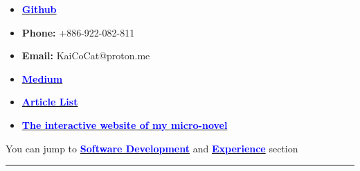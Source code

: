 
\begin{definitionbox}
{\footnotesize
\begin{itemize}[noitemsep]
    \item \href{https://github.com/Kuo-TingKai}{\textbf{\textcolor{blue}{Github}}}
    \item \textbf{Phone:} +886-922-082-811
    \item \textbf{Email:} KaiCoCat@proton.me
    \item \href{https://medium.com/@nehsm30126}{\textbf{\textcolor{blue}{Medium}}} 
    \item \href{https://www.overleaf.com/read/xzdtxtgxtnby#49163b}{\textbf{\textcolor{blue}{Article List}}}
    \item \href{https://github.com/Kuo-TingKai/theorem-dream}{\textbf{\textcolor{blue}{The interactive website of my micro-novel}}}
\end{itemize}
}
\end{definitionbox}

\begin{examplebox}
You can jump to \href{#software-dev}{\textbf{\textcolor{blue}{Software Development}}} and \href{#experience}{\textbf{\textcolor{blue}{Experience}}} section\\
\end{examplebox}

\hrule

